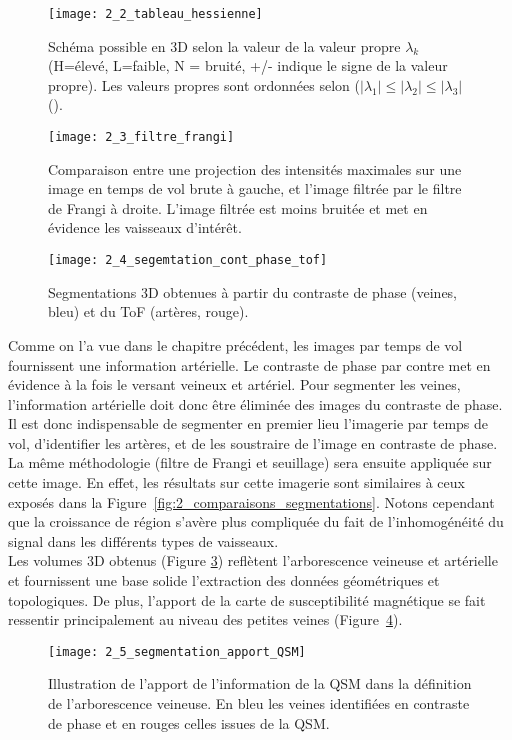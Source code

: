 \begin{figure}[!t]
\centering
\texttt{[image: 2\_2\_tableau\_hessienne]}
\caption{Schéma possible en 3D selon la valeur de la valeur propre $\lambda_k$ (H=élevé, L=faible, N = bruité, +/- indique le signe de la valeur propre). Les valeurs propres sont ordonnées selon ($|\lambda_1|\leqslant |\lambda_2|\leqslant |\lambda_3|$ (\cite{Frangi1998}).}
\label{fig:2_2_tableau_hessienne}	
\end{figure}
\begin{figure}[!t]
\centering
\texttt{[image: 2\_3\_filtre\_frangi]}
\caption{Comparaison entre une projection des intensités maximales sur une image en temps de vol brute à gauche, et l'image filtrée par le filtre de Frangi à droite. L'image filtrée est moins bruitée et met en évidence les vaisseaux d'intérêt.}
\label{fig:2_3_filtre_frangi}	
\end{figure}	
\begin{figure}[!b]
\centering
\texttt{[image: 2\_4\_segemtation\_cont\_phase\_tof]}
\caption{Segmentations 3D obtenues à partir du contraste de phase (veines, bleu) et du ToF (artères, rouge).}
\label{fig:2_4_segemtation_cont_phase_tof}	
\end{figure}	

Comme on l’a vue dans le chapitre précédent, les images par temps de vol fournissent une information artérielle. Le contraste de phase par contre met en évidence à la fois le versant veineux et artériel. Pour segmenter les veines, l’information artérielle doit donc être éliminée des images du contraste de phase. Il est donc indispensable de segmenter en premier lieu l’imagerie par temps de vol, d’identifier les artères, et de les soustraire de l’image en contraste de phase. La même méthodologie (filtre de Frangi et seuillage) sera ensuite appliquée sur cette image. En effet, les résultats sur cette imagerie sont similaires à ceux exposés dans la Figure~\ref{fig:2_comparaisons_segmentations}. Notons cependant que la croissance de région s'avère plus compliquée du fait de l'inhomogénéité du signal dans les différents types de vaisseaux.\\

Les volumes 3D obtenus (Figure \ref{fig:2_4_segemtation_cont_phase_tof}) reflètent l’arborescence veineuse et artérielle et fournissent une base solide l’extraction des données géométriques et topologiques. De plus, l’apport de la carte de susceptibilité magnétique se fait ressentir principalement au niveau des petites veines (Figure~\ref{fig:2_5_segmentation_apport_QSM}).
\begin{figure}[!t]
\centering
\texttt{[image: 2\_5\_segmentation\_apport\_QSM]}
\caption{Illustration de l'apport de l'information de la QSM dans la définition de l'arborescence veineuse. En bleu les veines identifiées en contraste de phase et en rouges celles issues de la QSM.}
\label{fig:2_5_segmentation_apport_QSM}	
\end{figure}	
